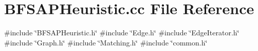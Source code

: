 \section{B\+F\+S\+A\+P\+Heuristic.\+cc File Reference}
\label{BFSAPHeuristic_8cc}
{\ttfamily \#include \char`\"{}B\+F\+S\+A\+P\+Heuristic.\+h\char`\"{}}\newline
{\ttfamily \#include \char`\"{}Edge.\+h\char`\"{}}\newline
{\ttfamily \#include \char`\"{}Edge\+Iterator.\+h\char`\"{}}\newline
{\ttfamily \#include \char`\"{}Graph.\+h\char`\"{}}\newline
{\ttfamily \#include \char`\"{}Matching.\+h\char`\"{}}\newline
{\ttfamily \#include \char`\"{}common.\+h\char`\"{}}\newline
